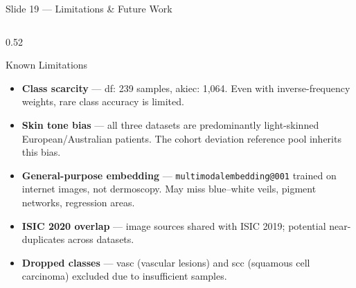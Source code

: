 \documentclass[aspectratio=169, 9pt]{beamer}
\begin{document}
\begin{frame}{Slide 19 --- Limitations \& Future Work}

  \begin{columns}[T]

    \begin{column}{0.52\textwidth}
      \begin{alertblock}{Known Limitations}
        \small
        \begin{itemize}[leftmargin=1em, itemsep=0pt]
          \item \textbf{Class scarcity} --- df: 239 samples, akiec: 1,064.
                Even with inverse-frequency weights, rare class accuracy is limited.
          \item \textbf{Skin tone bias} --- all three datasets are predominantly
                light-skinned European/Australian patients.
                The cohort deviation reference pool inherits this bias.
          \item \textbf{General-purpose embedding} ---
                \texttt{multimodalembedding@001} trained on internet images,
                not dermoscopy. May miss blue--white veils, pigment networks,
                regression areas.
          \item \textbf{ISIC 2020 overlap} --- image sources shared with ISIC 2019;
                potential near-duplicates across datasets.
          \item \textbf{Dropped classes} --- vasc (vascular lesions) and scc
                (squamous cell carcinoma) excluded due to insufficient samples.
        \end{itemize}
      \end{alertblock}
    \end{column}


\end{columns}
\end{frame}
\end{document}
